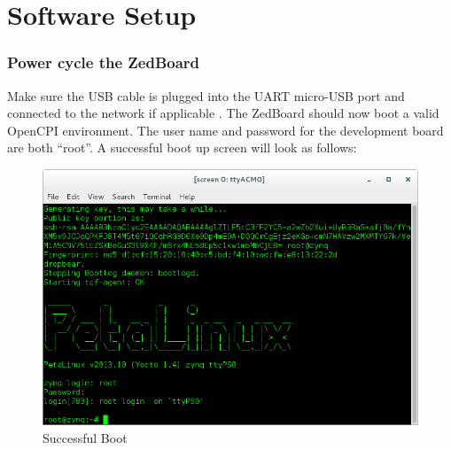 \section{Software Setup}

%

\subsubsection*{Power cycle the ZedBoard}
Make sure the USB cable is plugged into the UART micro-USB port and connected to the network if applicable . The ZedBoard should now boot a valid OpenCPI environment.  The user name and password for the development board are both ``root''.  A successful boot up screen will look as follows:

\begin{figure}[H]
	\centerline{\includegraphics[scale=0.5]{zed_boot}}
	\caption{Successful Boot}
	\label{fig:boot1}
\end{figure}
